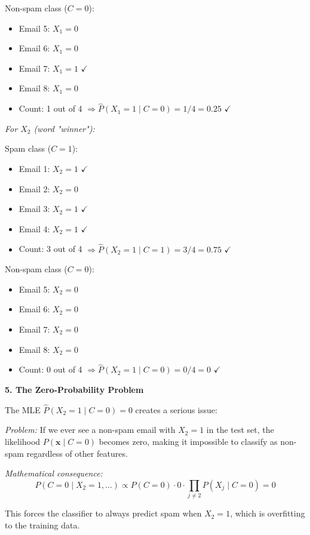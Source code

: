 \documentclass[12pt]{article}
\begin{document}
\begin{explanation}
Non-spam class ($C = 0$):
\begin{itemize}
    \item Email 5: $X_1 = 0$
    \item Email 6: $X_1 = 0$
    \item Email 7: $X_1 = 1$ $\checkmark$
    \item Email 8: $X_1 = 0$
    \item Count: 1 out of 4 $\Rightarrow \hat{P}(X_1 = 1 \mid C = 0) = 1/4 = 0.25$ $\checkmark$
\end{itemize}

\textit{For $X_2$ (word "winner"):}

Spam class ($C = 1$):
\begin{itemize}
    \item Email 1: $X_2 = 1$ $\checkmark$
    \item Email 2: $X_2 = 0$
    \item Email 3: $X_2 = 1$ $\checkmark$
    \item Email 4: $X_2 = 1$ $\checkmark$
    \item Count: 3 out of 4 $\Rightarrow \hat{P}(X_2 = 1 \mid C = 1) = 3/4 = 0.75$ $\checkmark$
\end{itemize}

Non-spam class ($C = 0$):
\begin{itemize}
    \item Email 5: $X_2 = 0$
    \item Email 6: $X_2 = 0$
    \item Email 7: $X_2 = 0$
    \item Email 8: $X_2 = 0$
    \item Count: 0 out of 4 $\Rightarrow \hat{P}(X_2 = 1 \mid C = 0) = 0/4 = 0$ $\checkmark$
\end{itemize}

\textbf{5. The Zero-Probability Problem}

The MLE $\hat{P}(X_2 = 1 \mid C = 0) = 0$ creates a serious issue:

\textit{Problem:} If we ever see a non-spam email with $X_2 = 1$ in the test set, the likelihood $P(\mathbf{x} \mid C = 0)$ becomes zero, making it impossible to classify as non-spam regardless of other features.

\textit{Mathematical consequence:}
\[
P(C = 0 \mid X_2 = 1, \ldots) \propto P(C = 0) \cdot 0 \cdot \prod_{j \neq 2} P(X_j \mid C = 0) = 0
\]

This forces the classifier to always predict spam when $X_2 = 1$, which is overfitting to the training data.


\end{explanation}
\end{document}
